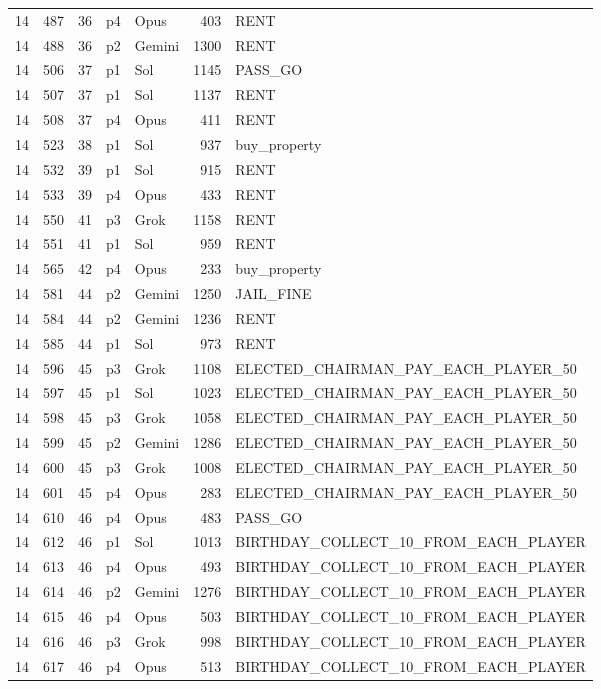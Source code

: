 \begin{longtable}{r r r l l r L{2.2in}}
14 & 487 & 36 & p4 & Opus & 403 & RENT \\
14 & 488 & 36 & p2 & Gemini & 1300 & RENT \\
14 & 506 & 37 & p1 & Sol & 1145 & PASS\_GO \\
14 & 507 & 37 & p1 & Sol & 1137 & RENT \\
14 & 508 & 37 & p4 & Opus & 411 & RENT \\
14 & 523 & 38 & p1 & Sol & 937 & buy\_property \\
14 & 532 & 39 & p1 & Sol & 915 & RENT \\
14 & 533 & 39 & p4 & Opus & 433 & RENT \\
14 & 550 & 41 & p3 & Grok & 1158 & RENT \\
14 & 551 & 41 & p1 & Sol & 959 & RENT \\
14 & 565 & 42 & p4 & Opus & 233 & buy\_property \\
14 & 581 & 44 & p2 & Gemini & 1250 & JAIL\_FINE \\
14 & 584 & 44 & p2 & Gemini & 1236 & RENT \\
14 & 585 & 44 & p1 & Sol & 973 & RENT \\
14 & 596 & 45 & p3 & Grok & 1108 & ELECTED\_CHAIRMAN\_PAY\_EACH\_PLAYER\_50 \\
14 & 597 & 45 & p1 & Sol & 1023 & ELECTED\_CHAIRMAN\_PAY\_EACH\_PLAYER\_50 \\
14 & 598 & 45 & p3 & Grok & 1058 & ELECTED\_CHAIRMAN\_PAY\_EACH\_PLAYER\_50 \\
14 & 599 & 45 & p2 & Gemini & 1286 & ELECTED\_CHAIRMAN\_PAY\_EACH\_PLAYER\_50 \\
14 & 600 & 45 & p3 & Grok & 1008 & ELECTED\_CHAIRMAN\_PAY\_EACH\_PLAYER\_50 \\
14 & 601 & 45 & p4 & Opus & 283 & ELECTED\_CHAIRMAN\_PAY\_EACH\_PLAYER\_50 \\
14 & 610 & 46 & p4 & Opus & 483 & PASS\_GO \\
14 & 612 & 46 & p1 & Sol & 1013 & BIRTHDAY\_COLLECT\_10\_FROM\_EACH\_PLAYER \\
14 & 613 & 46 & p4 & Opus & 493 & BIRTHDAY\_COLLECT\_10\_FROM\_EACH\_PLAYER \\
14 & 614 & 46 & p2 & Gemini & 1276 & BIRTHDAY\_COLLECT\_10\_FROM\_EACH\_PLAYER \\
14 & 615 & 46 & p4 & Opus & 503 & BIRTHDAY\_COLLECT\_10\_FROM\_EACH\_PLAYER \\
14 & 616 & 46 & p3 & Grok & 998 & BIRTHDAY\_COLLECT\_10\_FROM\_EACH\_PLAYER \\
14 & 617 & 46 & p4 & Opus & 513 & BIRTHDAY\_COLLECT\_10\_FROM\_EACH\_PLAYER \\

\end{longtable}
